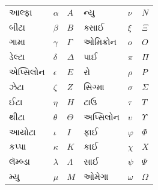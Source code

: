 \documentclass[../../../include/open-logic-chapter]{subfiles}
\begin{document}

\begin{center}
    \begin{tabular}{lll@{\qquad}lll}
    આલ્ફા &	$\alpha$ & $A$ &
    ન્યુ & $\nu$ & $N$ \\
    બીટા & $\beta$ & $B$ &
    ક્સાઈ & $\xi$ & $\Xi$ \\
    ગામા &	$\gamma$ & $\Gamma$ &
    ઓમિક્રોન & $o$ & $O$ \\
    ડેલ્ટા & $\delta$ & $\Delta$ &
    પાઈ & $\pi$ & $\Pi$ \\
    એપ્સિલોન & $\epsilon$ & $E$ &
    રો & $\rho$ & $P$ \\
    ઝેટા & $\zeta$ & $Z$ &
    સિગ્મા &	$\sigma$ & $\Sigma$ \\
    ઈટા & $\eta$ & $H$ &
    ટાઉ & $\tau$ & $T$ \\
    થીટા & $\theta$ & $\Theta$ &
    અપ્સિલોન & $\upsilon$ & $\Upsilon$ \\
    આયોટા & $\iota$ & $I$ &
    ફાઈ & $\varphi$ & $\Phi$ \\
    કપ્પા & $\kappa$ & $K$ &
    કાઈ & $\chi$ & $X$ \\
    લૅમ્બ્ડા & $\lambda$ & $\Lambda$ &
    સાઈ & $\psi$ & $\Psi$ \\
    મ્યુ & $\mu$ & $M$ &
    ઓમેગા & $\omega$ & $\Omega$
    \end{tabular}
\end{center}
\end{document}
